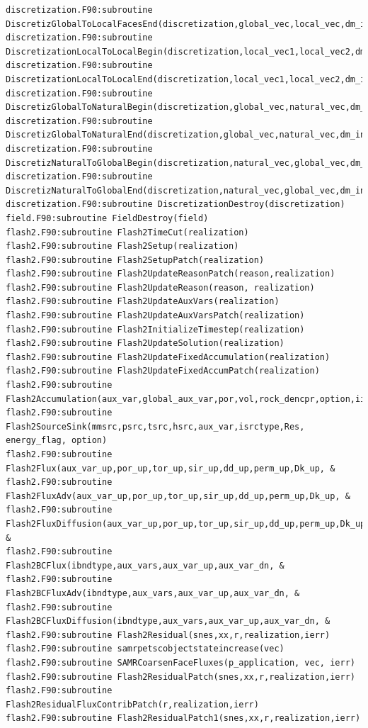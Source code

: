 \documentclass[12pt]{article}
\begin{document}
\begin{verbatim}
discretization.F90:subroutine DiscretizGlobalToLocalFacesEnd(discretization,global_vec,local_vec,dm_index)
discretization.F90:subroutine DiscretizationLocalToLocalBegin(discretization,local_vec1,local_vec2,dm_index)
discretization.F90:subroutine DiscretizationLocalToLocalEnd(discretization,local_vec1,local_vec2,dm_index)
discretization.F90:subroutine DiscretizGlobalToNaturalBegin(discretization,global_vec,natural_vec,dm_index)
discretization.F90:subroutine DiscretizGlobalToNaturalEnd(discretization,global_vec,natural_vec,dm_index)
discretization.F90:subroutine DiscretizNaturalToGlobalBegin(discretization,natural_vec,global_vec,dm_index)
discretization.F90:subroutine DiscretizNaturalToGlobalEnd(discretization,natural_vec,global_vec,dm_index)
discretization.F90:subroutine DiscretizationDestroy(discretization)
field.F90:subroutine FieldDestroy(field)
flash2.F90:subroutine Flash2TimeCut(realization)
flash2.F90:subroutine Flash2Setup(realization)
flash2.F90:subroutine Flash2SetupPatch(realization)
flash2.F90:subroutine Flash2UpdateReasonPatch(reason,realization)
flash2.F90:subroutine Flash2UpdateReason(reason, realization)
flash2.F90:subroutine Flash2UpdateAuxVars(realization)
flash2.F90:subroutine Flash2UpdateAuxVarsPatch(realization)
flash2.F90:subroutine Flash2InitializeTimestep(realization)
flash2.F90:subroutine Flash2UpdateSolution(realization)
flash2.F90:subroutine Flash2UpdateFixedAccumulation(realization)
flash2.F90:subroutine Flash2UpdateFixedAccumPatch(realization)
flash2.F90:subroutine Flash2Accumulation(aux_var,global_aux_var,por,vol,rock_dencpr,option,iireac,Res)
flash2.F90:subroutine Flash2SourceSink(mmsrc,psrc,tsrc,hsrc,aux_var,isrctype,Res, energy_flag, option)
flash2.F90:subroutine Flash2Flux(aux_var_up,por_up,tor_up,sir_up,dd_up,perm_up,Dk_up, &
flash2.F90:subroutine Flash2FluxAdv(aux_var_up,por_up,tor_up,sir_up,dd_up,perm_up,Dk_up, &
flash2.F90:subroutine Flash2FluxDiffusion(aux_var_up,por_up,tor_up,sir_up,dd_up,perm_up,Dk_up, &
flash2.F90:subroutine Flash2BCFlux(ibndtype,aux_vars,aux_var_up,aux_var_dn, &
flash2.F90:subroutine Flash2BCFluxAdv(ibndtype,aux_vars,aux_var_up,aux_var_dn, &
flash2.F90:subroutine Flash2BCFluxDiffusion(ibndtype,aux_vars,aux_var_up,aux_var_dn, &
flash2.F90:subroutine Flash2Residual(snes,xx,r,realization,ierr)
flash2.F90:subroutine samrpetscobjectstateincrease(vec)
flash2.F90:subroutine SAMRCoarsenFaceFluxes(p_application, vec, ierr)
flash2.F90:subroutine Flash2ResidualPatch(snes,xx,r,realization,ierr)
flash2.F90:subroutine Flash2ResidualFluxContribPatch(r,realization,ierr)
flash2.F90:subroutine Flash2ResidualPatch1(snes,xx,r,realization,ierr)

\end{verbatim}
\end{document}
